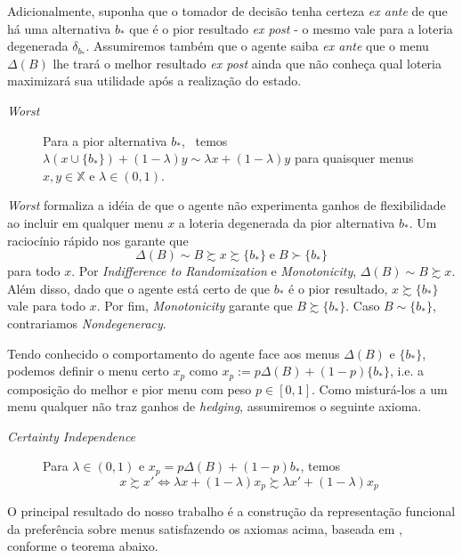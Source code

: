 \documentclass[11pt, a4paper]{article}
\theoremstyle{nonumberplain}
\theoremstyle{plain}
\theoremstyle{plain}
\theoremstyle{plain}
\begin{document}
Adicionalmente, suponha que o tomador de decisão tenha certeza \textit{ex ante} de que há uma alternativa $b_*$ que é o pior resultado \textit{ex post} - o mesmo vale para a loteria degenerada $\delta_{b_*}$. Assumiremos também que o agente saiba \textit{ex ante} que o menu $\Delta(B)$ lhe trará o melhor resultado \textit{ex post} ainda que não conheça qual loteria maximizará sua utilidade após a realização do estado.   

\begin{description}
\item[\textit{Worst}] Para a pior alternativa $b_*$, ~temos $\lambda\left(x\cup \{b_*\}\right)+(1-\lambda)y\sim \lambda x + (1-\lambda)y$ para quaisquer menus $x,y\in \mathbb{X}$ e $\lambda\in (0,1)$. 
\end{description}

\textit{Worst} formaliza a idéia de que o agente não experimenta ganhos de flexibilidade ao incluir  em qualquer menu $x$ a loteria degenerada da pior alternativa $b_*$. Um raciocínio rápido nos garante que $$\Delta(B)\sim B\succsim x\succsim \{b_*\} \; \text{e} \; B\succ \{b_*\}$$ para todo $x$. Por \textit{Indifference to Randomization} e \textit{Monotonicity}, $\Delta(B)\sim B \succsim x$. Além disso, dado que o agente está certo de que $b_*$ é o pior resultado, $x\succsim \{b_*\}$ vale para todo $x$. Por fim, \textit{Monotonicity} garante que $B\succsim \{b_*\}$. Caso $B \sim \{b_*\}$, contrariamos \textit{Nondegeneracy}. 

Tendo conhecido o comportamento do agente face aos menus $\Delta(B)$ e $\{b_*\}$, podemos definir o menu certo $x_p$ como $x_p:=p\Delta(B)+(1-p)\{b_*\}$, i.e. a composição do melhor e pior menu com peso $p\in [0,1]$. Como misturá-los a um menu qualquer não traz ganhos de \emph{hedging}, assumiremos o seguinte axioma.

\begin{description}
\item [\textit{Certainty Independence}] Para $\lambda\in (0,1)$ e $x_p=p\Delta(B)+(1-p)b_*$, temos $$x\succsim x' \Leftrightarrow \lambda x +(1-\lambda)x_p\succsim \lambda x' + (1-\lambda)x_p$$ 

\end{description}

O principal resultado do nosso trabalho é a construção da representação funcional da preferência sobre menus satisfazendo os axiomas acima, baseada em \cite{Epstein2007}, conforme o teorema abaixo.
\end{document}
